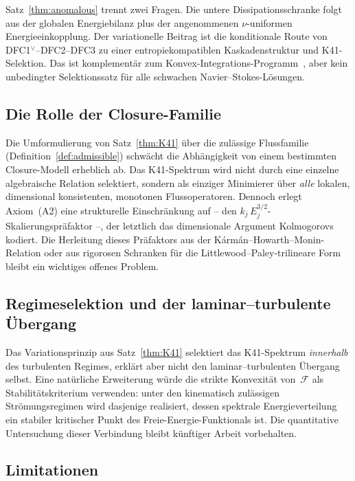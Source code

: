 \documentclass[12pt,a4paper]{article}
\theoremstyle{breakdef}
\theoremstyle{breakplain}
\theoremstyle{breakdef}
\begin{document}
Satz~\ref{thm:anomalous} trennt zwei Fragen. Die untere
Dissipationsschranke folgt aus der globalen Energiebilanz plus der
angenommenen \(\nu\)-uniformen Energieeinkopplung. Der variationelle Beitrag
ist die konditionale Route von DFC1$^\vee$--DFC2--DFC3 zu einer
entropiekompatiblen Kaskadenstruktur und K41-Selektion. Das ist
komplementär zum Konvex-Integrations-Programm~\cite{Isett18,BV19,AlbrittonBrueColombo2022}, aber
kein unbedingter Selektionssatz für alle schwachen Navier--Stokes-Lösungen.

\subsection{Die Rolle der Closure-Familie}

Die Umformulierung von Satz~\ref{thm:K41} über die zulässige
Flussfamilie (Definition~\ref{def:admissible}) schwächt die Abhängigkeit
von einem bestimmten Closure-Modell erheblich ab. Das K41-Spektrum wird
nicht durch eine einzelne algebraische Relation selektiert, sondern als
einziger Minimierer über \emph{alle} lokalen, dimensional konsistenten,
monotonen Flussoperatoren. Dennoch erlegt Axiom~(A2) eine strukturelle
Einschränkung auf -- den $k_j\,E_j^{3/2}$-Skalierungspräfaktor --, der
letztlich das dimensionale Argument Kolmogorovs kodiert. Die Herleitung
dieses Präfaktors aus der Kármán--Howarth--Monin-Relation oder aus
rigorosen Schranken für die Littlewood--Paley-trilineare Form bleibt ein
wichtiges offenes Problem.

\subsection{Regimeselektion und der laminar--turbulente Übergang}

Das Variationsprinzip aus Satz~\ref{thm:K41} selektiert das K41-Spektrum
\emph{innerhalb} des turbulenten Regimes, erklärt aber nicht den
laminar--turbulenten Übergang selbst. Eine natürliche Erweiterung würde
die strikte Konvexität von~$\mathcal{F}$ als Stabilitätskriterium
verwenden: unter den kinematisch zulässigen Strömungsregimen wird
dasjenige realisiert, dessen spektrale Energieverteilung ein stabiler
kritischer Punkt des Freie-Energie-Funktionals ist. Die quantitative
Untersuchung dieser Verbindung bleibt künftiger Arbeit vorbehalten.

\subsection{Limitationen}
\end{document}
